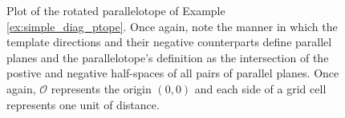 \begin{example}
  \begin{figure}[h!]
    \centering
    \caption{Plot of the rotated parallelotope of Example \ref{ex:simple_diag_ptope}. Once again, note the manner in which the template directions and their negative counterparts define parallel planes and the parallelotope's definition as the intersection of the postive and negative half-spaces of all pairs of parallel planes. Once again, $\mathcal{O}$ represents the origin $(0,0)$ and each side of a grid cell represents one unit of distance.}
    \label{fig:diagonal_ptope}
  \end{figure}
\end{example}


